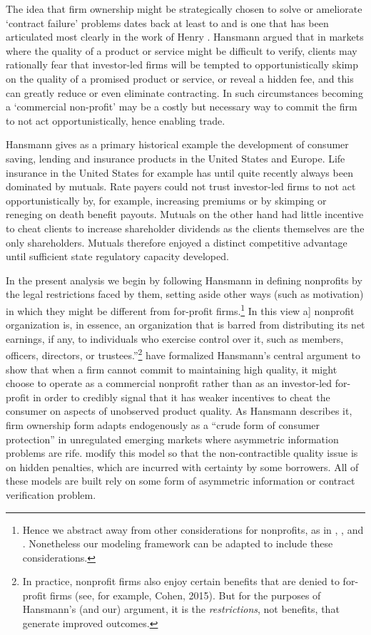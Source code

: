 \documentclass[11pt,english]{article}
\theoremstyle{plain}
\theoremstyle{definition}
\begin{document}
The idea that firm ownership might be strategically chosen to solve
or ameliorate `contract failure' problems dates back at least to \citet{arrow1963}
and is one that has been articulated most clearly in the work of Henry
\citet{hansmann1996}. Hansmann argued that in markets
where the quality of a product or service might be difficult to verify,
clients may rationally fear that investor-led firms will be tempted
to opportunistically skimp on the quality of a promised product or
service, or reveal a hidden fee, and this can greatly reduce or even
eliminate contracting. In such circumstances becoming a `commercial
non-profit' may be a costly but necessary way to commit the firm to
not act opportunistically, hence enabling trade.

Hansmann gives as a primary historical example the development of
consumer saving, lending and insurance products in the United States
and Europe. Life insurance in the United States for example has until
quite recently always been dominated by mutuals. Rate payers could
not trust investor-led firms to not act opportunistically by, for
example, increasing premiums or by skimping or reneging on death benefit
payouts. Mutuals on the other hand had little incentive to cheat clients
to increase shareholder dividends as the clients themselves are the
only shareholders. Mutuals therefore enjoyed a distinct competitive
advantage until sufficient state regulatory capacity developed.

In the present analysis we begin by following Hansmann in defining
nonprofits by the legal restrictions faced by them, setting aside
other ways (such as motivation) in which they might be different from
for-profit firms.\footnote{Hence we abstract away from other considerations for nonprofits, as
in \citet{besley2005}, \citet{mcintosh2005},
and \citet{guha2013}. Nonetheless our modeling framework
can be adapted to include these considerations.} In this view \textquotedbl{}{[}a{]} nonprofit organization is, in
essence, an organization that is barred from distributing its net
earnings, if any, to individuals who exercise control over it, such
as members, officers, directors, or trustees.\textquotedblright \footnote{In practice, nonprofit firms also enjoy certain benefits that are
denied to for-profit firms (see, for example, Cohen, 2015). But for
the purposes of Hansmann's (and our) argument, it is the \textit{restrictions},
not benefits, that generate improved outcomes.} \citet{glaeser2001} have formalized Hansmann's central
argument to show that when a firm cannot commit to maintaining high
quality, it might choose to operate as a commercial nonprofit rather
than as an investor-led for-profit in order to credibly signal that
it has weaker incentives to cheat the consumer on aspects of unobserved
product quality. As Hansmann describes it, firm ownership form adapts
endogenously as a ``crude form of consumer protection'' in unregulated
emerging markets where asymmetric information problems are rife. \citet{bubb_consumer_2013}
modify this model so that the non-contractible quality issue is on
hidden penalties, which are incurred with certainty by some borrowers.
All of these models are built rely on some form of asymmetric information
or contract verification problem.
\end{document}
